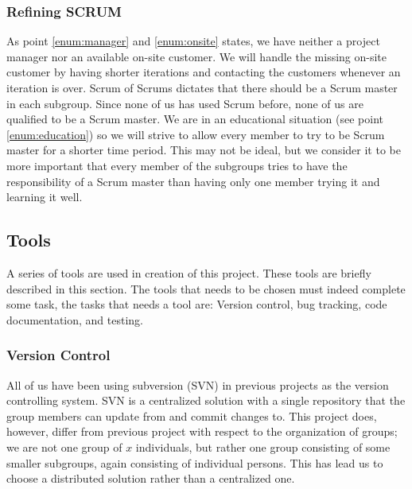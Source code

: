 \subsubsection{Refining SCRUM} 
As point \ref{enum:manager} and \ref{enum:onsite} states, we have neither a project manager nor an available on-site customer.
We will handle the missing on-site customer by having shorter iterations and contacting the customers whenever an iteration is over.
Scrum of Scrums\cite{scrumOfScrums} dictates that there should be a Scrum master in each subgroup.
Since none of us has used Scrum before, none of us are qualified to be a Scrum master.
We are in an educational situation (see point \ref{enum:education}) so we will strive to allow every member to try to be Scrum master for a shorter time period.
This may not be ideal, but we consider it to be more important that every member of the subgroups tries to have the responsibility of a Scrum master than having only one member trying it and learning it well.

\begin{comment}
There is more:
*Scrum board
*The phases / meetings
**estimation
**sprint planning
*Scrum meetings
*Scrum of scrum def
*project manager problem
\end{comment}


\subsection{Tools}\label{subsec:tools}
A series of tools are used in creation of this project.
These tools are briefly described in this section.
The tools that needs to be chosen must indeed complete some task, the tasks that needs a tool are: Version control, bug tracking, code documentation, and testing.

\subsubsection{Version Control}
All of us have been using subversion (SVN) in previous projects as the version controlling system.
SVN is a centralized solution \cite{subversion} with a single repository that the group members can update from and commit changes to.
This project does, however, differ from previous project with respect to the organization of groups; we are not one group of $x$ individuals, but rather one group consisting of some smaller subgroups, again consisting of individual persons.
This has lead us to choose a distributed solution rather than a centralized one.

